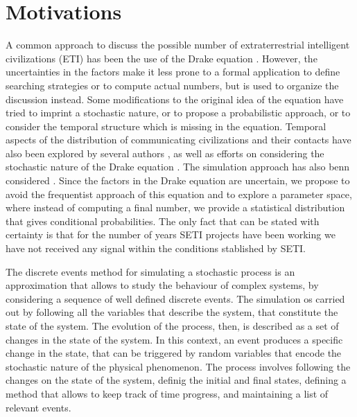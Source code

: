 \documentclass[crop]{CSLB}%
\begin{document}
\Fpagebreak





\section{Motivations}

A common approach to discuss the possible number of extraterrestrial
intelligent civilizations (ETI) has been the use of the Drake equation
\citep{Gleiser2010, Prantzos2013, Haqq-Misra2017}.
%
However, the uncertainties in the factors make it less prone to a
formal application to define searching strategies or to compute
actual numbers, but is used to organize the discussion instead.
%
Some modifications to the original idea of the equation have tried to
imprint a stochastic nature, or to propose a probabilistic approach,
or to consider the temporal structure which is missing in the
equation.
%
Temporal aspects of the distribution of communicating civilizations
and their contacts have also been explored by several authors
\citep{Fogg1987, Forgan2011, Balbi2018},
%
as well as efforts on considering the stochastic nature of the Drake equation
\citep{Glade2011}.
%
The simulation approach has also benn considered
\citep{Forgan2008, Forgan2010}.
%
Since the factors in the Drake equation are uncertain, we propose to
avoid the frequentist approach of this equation
and to explore a parameter space, where instead of computing a final
number, we provide a statistical distribution that gives conditional
probabilities.
%
The only fact that can be stated with certainty is that for the number
of years SETI projects have been working we have not received any
signal within the conditions stablished by SETI.



The discrete events method for simulating a stochastic process is an
approximation that allows to study the behaviour of complex
systems, by considering a sequence of well defined discrete events.
%
The simulation os carried out by following all the variables that
describe the system, that constitute the state of the system.
%
The evolution of the process, then, is described as a set of changes
in the state of the system.
%
In this context, an event produces a specific change in the state,
that can be triggered by random variables that encode the stochastic
nature of the physical phenomenon.
%
The process involves following the changes on the state of the system,
definig the initial and final states, defining a method that allows to
keep track of time progress, and maintaining a list of relevant
events.
\end{document}
